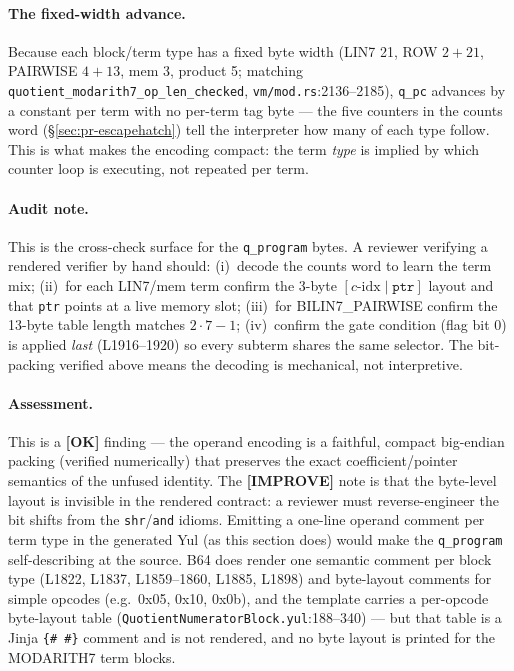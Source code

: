 \paragraph{The fixed-width advance.}
Because each block/term type has a fixed byte width (LIN7 21,
ROW $2{+}21$, PAIRWISE $4{+}13$, mem 3, product 5; matching
\texttt{quotient\_\allowbreak{}modarith7\_\allowbreak{}op\_\allowbreak{}len\_\allowbreak{}checked}, \texttt{vm/mod.rs}:2136--2185),
\texttt{q\_pc} advances by a constant per term with no per-term
tag byte --- the five counters in the counts word
(§\ref{sec:pr-escapehatch}) tell the interpreter how many of each
type follow. This is what makes the encoding compact: the term
\emph{type} is implied by which counter loop is executing, not
repeated per term.

\paragraph{Audit note.} This is the cross-check surface for the
\texttt{q\_program} bytes. A reviewer verifying a rendered
verifier by hand should: (i)~decode the counts word to learn the
term mix; (ii)~for each LIN7/mem term confirm the 3-byte
$[c\text{-idx}\mid\texttt{ptr}]$ layout and that
\texttt{ptr} points at a live memory slot; (iii)~for
BILIN7\_PAIRWISE confirm the 13-byte table length matches
$2\cdot 7 - 1$; (iv)~confirm the gate condition (flag bit 0) is
applied \emph{last} (L1916--1920) so every subterm shares the
same selector. The bit-packing verified above means the decoding
is mechanical, not interpretive.

\paragraph{Assessment.} This is a
\textcolor{tracegreen}{\textbf{[OK]}} finding --- the operand
encoding is a faithful, compact big-endian packing (verified
numerically) that preserves the exact coefficient/pointer
semantics of the unfused identity. The
\textcolor{codegenblue}{\textbf{[IMPROVE]}} note is that the
byte-level layout is invisible in the rendered contract: a
reviewer must reverse-engineer the bit shifts from the
\texttt{shr}/\texttt{and} idioms. Emitting a one-line operand
comment per term type in the generated Yul (as this section does)
would make the \texttt{q\_program} self-describing at the source.
 B64 does render one semantic comment per block
type (L1822, L1837, L1859--1860, L1885, L1898) and byte-layout
comments for simple opcodes (e.g.\ 0x05, 0x10, 0x0b), and the
template carries a per-opcode byte-layout table
(\texttt{QuotientNumeratorBlock.yul}:188--340) --- but that table
is a Jinja \texttt{\{\# \#\}} comment and is not rendered, and no
byte layout is printed for the MODARITH7 term blocks.

